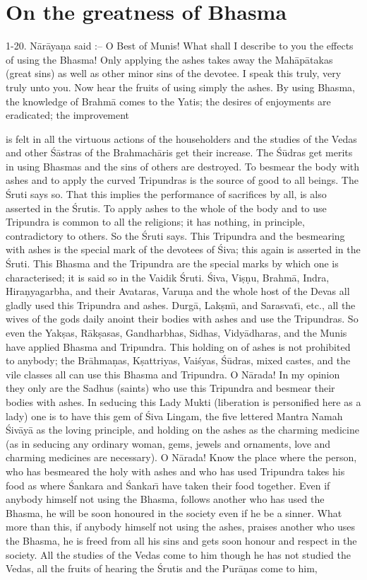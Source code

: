 \chapter{On the greatness of Bhasma}

1-20. N\=ar\=aya\d{n}a said :-- O Best of Munis! What shall I describe to you the effects of using the Bhasma! Only applying the ashes takes away the Mah\=ap\=atakas (great sins) as well as other minor sins of the devotee. I speak this truly, very truly unto you. Now hear the fruits of using simply the ashes. By using Bhasma, the knowledge of Brahm\=a comes to the Yatis; the desires of enjoyments are eradicated; the improvement

is felt in all the virtuous actions of the householders and the studies of the Vedas and other \'S\=astras of the Brahmach\=aris get their increase. The \'S\=udras get merits in using Bhasmas and the sins of others are destroyed. To besmear the body with ashes and to apply the curved Tripundras is the source of good to all beings. The \'Sruti says so. That this implies the performance of sacrifices by all, is also asserted in the \'Srutis. To apply ashes to the whole of the body and to use Tripundra is common to all the religions; it has nothing, in principle, contradictory to others. So the \'Sruti says. This Tripundra and the besmearing with ashes is the special mark of the devotees of \'Siva; this again is asserted in the \'Sruti. This Bhasma and the Tripundra are the special marks by which one is characterised; it is said so in the Vaidik \'Sruti. \'Siva, Vi\d{s}\d{n}u, Brahm\=a, Indra, Hira\d{n}yagarbha, and their Avataras, Varu\d{n}a and the whole host of the Devas all gladly used this Tripundra and ashes. Durg\=a, Lak\d{s}m\={\i}, and Sarasvat\={\i}, etc., all the wives of the gods daily anoint their bodies with ashes and use the Tripundras. So even the Yak\d{s}as, R\=ak\d{s}asas, Gandharbhas, Sidhas, Vidy\=adharas, and the Munis have applied Bhasma and Tripundra. This holding on of ashes is not prohibited to anybody; the Br\=ahma\d{n}as, K\d{s}attriyas, Vai\'syas, \'S\=udras, mixed castes, and the vile classes all can use this Bhasma and Tripundra. O N\=arada! In my opinion they only are the Sadhus (saints) who use this Tripundra and besmear their bodies with ashes. In seducing this Lady Mukti (liberation is personified here as a lady) one is to have this gem of \'Siva Lingam, the five lettered Mantra Namah \'Siv\=ay\=a as the loving principle, and holding on the ashes as the charming medicine (as in seducing any ordinary woman, gems, jewels and ornaments, love and charming medicines are necessary). O N\=arada! Know the place where the person, who has besmeared the holy with ashes and who has used Tripundra takes his food as where \'Sankara and \'Sankar\={\i} have taken their food together. Even if anybody himself not using the Bhasma, follows another who has used the Bhasma, he will be soon honoured in the society even if he be a sinner. What more than this, if anybody himself not using the ashes, praises another who uses the Bhasma, he is freed from all his sins and gets soon honour and respect in the society. All the studies of the Vedas come to him though he has not studied the Vedas, all the fruits of hearing the \'Srutis and the Pur\=a\d{n}as come to him, 
